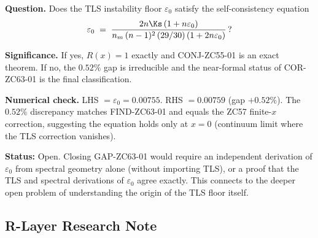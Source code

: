 \documentclass[12pt, a4paper]{article}
\begin{document}
\begin{openqbox}[title={GAP-ZC63-01: TLS--Spectral
  Self-Consistency ($R_0$, Open)}]
\textbf{Question.}
Does the TLS instability floor $\varepsilon_0$ satisfy the
self-consistency equation
\[
  \varepsilon_0
  \;=\;
  \frac{2n\Ks\,(1+n\varepsilon_0)}
       {n_m\,(n-1)^2\,(29/30)\,(1+2n\varepsilon_0)}\,?
\]

\textbf{Significance.}
If yes, $R(x)=1$ exactly and CONJ-ZC55-01 is an exact theorem.
If no, the $0.52\%$ gap is irreducible and the near-formal
status of COR-ZC63-01 is the final classification.

\textbf{Numerical check.}
LHS $= \varepsilon_0 = 0.00755$.
RHS $= 0.00759$ (gap $+0.52\%$).
The $0.52\%$ discrepancy matches FIND-ZC63-01
and equals the ZC57 finite-$x$ correction, suggesting
the equation holds only at $x=0$ (continuum limit where
the TLS correction vanishes).

\textbf{Status:} Open.
Closing GAP-ZC63-01 would require an independent derivation
of $\varepsilon_0$ from spectral geometry alone (without importing
TLS), or a proof that the TLS and spectral derivations
of $\varepsilon_0$ agree exactly.
This connects to the deeper open problem of understanding
the origin of the TLS floor itself.
\end{openqbox}

\subsection{R-Layer Research Note}
\label{sec:rlayer}
\end{document}
